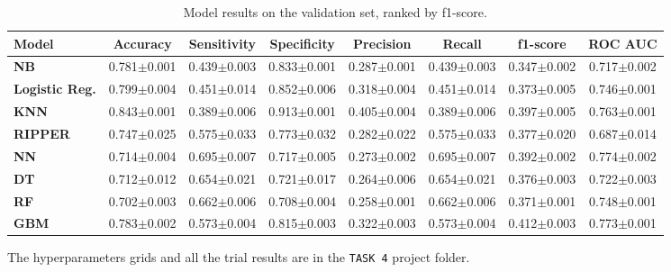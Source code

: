 \begin{table}[H]
    \centering
    \scriptsize
    \begin{tabular}{p{2.0cm}ccccccc}
    \toprule
    \textbf{Model} & \textbf{Accuracy} & \textbf{Sensitivity} & \textbf{Specificity} & \textbf{Precision} & \textbf{Recall} & \textbf{f1-score} & \textbf{ROC AUC} \\
    \midrule
    \textbf{NB} 
      & 0.781$\pm$0.001
      & 0.439$\pm$0.003
      & 0.833$\pm$0.001
      & 0.287$\pm$0.001
      & 0.439$\pm$0.003
      & 0.347$\pm$0.002
      & 0.717$\pm$0.002 \\
    \textbf{Logistic Reg.} 
      & 0.799$\pm$0.004
      & 0.451$\pm$0.014
      & 0.852$\pm$0.006
      & 0.318$\pm$0.004
      & 0.451$\pm$0.014
      & 0.373$\pm$0.005
      & 0.746$\pm$0.001 \\
    \textbf{KNN}
      & 0.843$\pm$0.001
      & 0.389$\pm$0.006
      & 0.913$\pm$0.001
      & 0.405$\pm$0.004
      & 0.389$\pm$0.006
      & 0.397$\pm$0.005
      & 0.763$\pm$0.001 \\
    \textbf{RIPPER}
      & 0.747$\pm$0.025
      & 0.575$\pm$0.033
      & 0.773$\pm$0.032
      & 0.282$\pm$0.022
      & 0.575$\pm$0.033
      & 0.377$\pm$0.020
      & 0.687$\pm$0.014 \\
    \textbf{NN}
      & 0.714$\pm$0.004
      & 0.695$\pm$0.007
      & 0.717$\pm$0.005
      & 0.273$\pm$0.002
      & 0.695$\pm$0.007
      & 0.392$\pm$0.002
      & 0.774$\pm$0.002 \\    
    \textbf{DT} 
      & 0.712$\pm$0.012
      & 0.654$\pm$0.021
      & 0.721$\pm$0.017
      & 0.264$\pm$0.006
      & 0.654$\pm$0.021
      & 0.376$\pm$0.003
      & 0.722$\pm$0.003 \\
    \textbf{RF} 
      & 0.702$\pm$0.003
      & 0.662$\pm$0.006
      & 0.708$\pm$0.004
      & 0.258$\pm$0.001
      & 0.662$\pm$0.006
      & 0.371$\pm$0.001
      & 0.748$\pm$0.001 \\
    \textbf{GBM}
      & 0.783$\pm$0.002
      & 0.573$\pm$0.004
      & 0.815$\pm$0.003
      & 0.322$\pm$0.003
      & 0.573$\pm$0.004
      & 0.412$\pm$0.003
      & 0.773$\pm$0.001 \\
    \bottomrule
    \end{tabular}
    \caption{\small Model results on the validation set, ranked by f1-score.}
    \label{tab:results}
\end{table}


\noindent The hyperparameters grids and all the trial results are in the \texttt{TASK 4} project folder.

